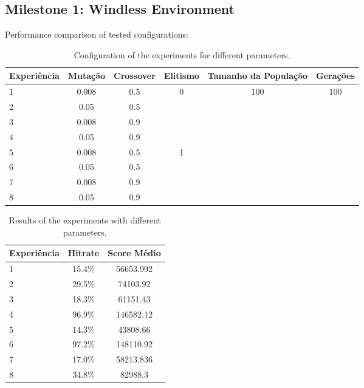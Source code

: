 \documentclass{article}
\begin{document}
\subsection{Milestone 1: Windless Environment}
Performance comparison of tested configurations:

\begin{table}[h]
\centering
\begin{tabular}{|l|c|c|c|c|c|}
\hline
\textbf{Experiência} & \textbf{Mutação} & \textbf{Crossover} & \textbf{Elitismo} & \textbf{Tamanho da População} & \textbf{Gerações} \\ 
\hline
1 & 0.008 & 0.5 & \multirow{4}{*}{0} & \multirow{8}{*}{100} & \multirow{8}{*}{100} \\ 
\cline{1-3}
2 & 0.05 & 0.5 & & & \\ 
\cline{1-3}
3 & 0.008 & 0.9 & & & \\ 
\cline{1-3}
4 & 0.05 & 0.9 & & & \\ 
\cline{1-4}
5 & 0.008 & 0.5 & \multirow{4}{*}{1} & & \\ 
\cline{1-3}
6 & 0.05 & 0.5 & & & \\ 
\cline{1-3}
7 & 0.008 & 0.9 & & & \\ 
\cline{1-3}
8 & 0.05 & 0.9 & & & \\ 
\hline
\end{tabular}
\caption{Configuration of the experiments for different parameters.}
\end{table}

\begin{table}[h]
\centering
\begin{tabular}{|l|c|c|}
\hline
\textbf{Experiência} & \textbf{Hitrate} & \textbf{Score Médio} \\ \hline
1 & 15.4\% & 56653.992 \\ \hline
2 & 29.5\% & 74103.92 \\ \hline
3 & 18.3\% & 61151.43 \\ \hline
4 & 96.9\% & 146582.12 \\ \hline
5 & 14.3\% & 43808.66 \\ \hline
6 & 97.2\% & 148110.92 \\ \hline
7 & 17.0\% & 58213.836 \\ \hline
8 & 34.8\% & 82988.3 \\ \hline
\end{tabular}
\caption{Results of the experiments with different parameters.}
\end{table}
\end{document}
